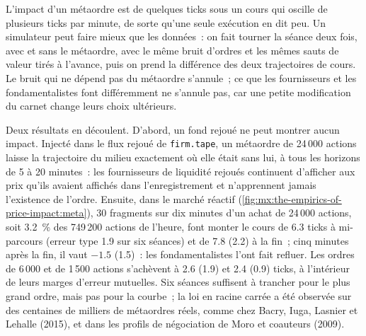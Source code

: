 L'impact d'un métaordre est de quelques ticks sous un cours qui oscille de plusieurs ticks par minute, de sorte qu'une seule exécution en dit peu. Un simulateur peut faire mieux
que les données~: on fait tourner la séance deux fois, avec et sans le métaordre, avec le même bruit d'ordres et les mêmes sauts de valeur tirés à l'avance, puis on prend la différence des
deux trajectoires de cours. Le bruit qui ne dépend pas du métaordre s'annule~; ce que les fournisseurs et les fondamentalistes font différemment ne s'annule pas, car une petite
modification du carnet change leurs choix ultérieurs.

Deux résultats en découlent. D'abord, un fond rejoué ne peut montrer aucun impact. Injecté dans le flux rejoué de \texttt{firm.tape}, un métaordre de 24\,000 actions
laisse la trajectoire du milieu exactement où elle était sans lui, à tous les horizons de 5 à 20 minutes~: les fournisseurs de liquidité rejoués continuent d'afficher aux prix
qu'ils avaient affichés dans l'enregistrement et n'apprennent jamais l'existence de l'ordre. Ensuite, dans le marché réactif (\cref{fig:mx:the-empirics-of-price-impact:meta}), 30 fragments
sur dix minutes d'un achat de 24\,000 actions, soit 3.2~\% des 749\,200 actions de l'heure, font monter le cours de 6.3 ticks à mi-parcours (erreur type 1.9 sur six séances)
et de 7.8 (2.2) à la fin~; cinq minutes après la fin, il vaut $-1.5$ (1.5)~: les fondamentalistes l'ont fait refluer. Les ordres de 6\,000 et de 1\,500 actions s'achèvent à
2.6 (1.9) et 2.4 (0.9) ticks, à l'intérieur de leurs marges d'erreur mutuelles. Six séances suffisent à trancher pour le plus grand ordre, mais pas pour la courbe~; la loi en racine carrée a été observée
sur des centaines de milliers de métaordres réels, comme chez Bacry, Iuga, Lasnier et Lehalle (2015), et dans les profils de négociation de Moro et coauteurs (2009).

